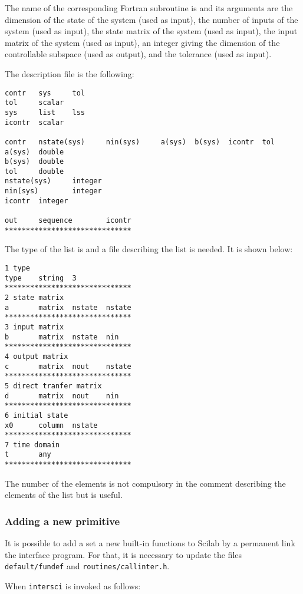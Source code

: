 The name of the corresponding Fortran subroutine is  and its
arguments are the dimension of the state of the system (used as input), the
number of inputs of the system (used as input), 
the state matrix of the system (used as input),
the input matrix of the system (used as input),
an integer giving the dimension of the controllable subspace (used as output),
and the tolerance (used as input).

The description file is the following:
\begin{verbatim}
contr   sys     tol
tol     scalar
sys     list    lss
icontr  scalar

contr   nstate(sys)     nin(sys)     a(sys)  b(sys)  icontr  tol
a(sys)  double
b(sys)  double
tol     double
nstate(sys)     integer
nin(sys)        integer
icontr  integer

out     sequence        icontr
******************************
\end{verbatim}

The type of the list is  and a file describing the list  is
needed. It is shown below:

\begin{verbatim}
1 type
type    string  3
******************************
2 state matrix
a       matrix  nstate  nstate
******************************
3 input matrix
b       matrix  nstate  nin
******************************
4 output matrix
c       matrix  nout    nstate
******************************
5 direct tranfer matrix
d       matrix  nout    nin
******************************
6 initial state
x0      column  nstate
******************************
7 time domain
t       any
******************************
\end{verbatim}

The number of the elements is not compulsory in the comment describing the
elements of the list but is useful.


\subsubsection{Adding a new primitive}

It is possible to add a set a new built-in functions to Scilab
by a permanent link the interface program. 
For that, it is necessary to update the files {\tt default/fundef}
and {\tt   routines/callinter.h}.

When {\tt intersci} is invoked as follows:\\

